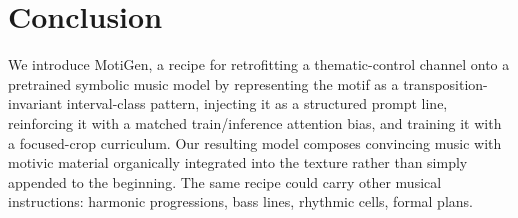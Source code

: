 \documentclass{article}
\newcommand{\method}{MotiGen}
\newcommand{\cmtS}[1]{{\color{blue} (Simon: #1)}}
\begin{document}




\section{Conclusion}
\label{sec:conclusion}

We introduce \method{}, a recipe for retrofitting a thematic-control channel onto a pretrained symbolic music model by representing the motif as a transposition-invariant interval-class pattern, injecting it as a structured prompt line, reinforcing it with a matched train/inference attention bias, and training it with a focused-crop curriculum. Our resulting model composes convincing music with motivic material organically integrated into the texture rather than simply appended to the beginning. The same recipe could carry other musical instructions: harmonic progressions, bass lines, rhythmic cells, formal plans. %




\end{document}
